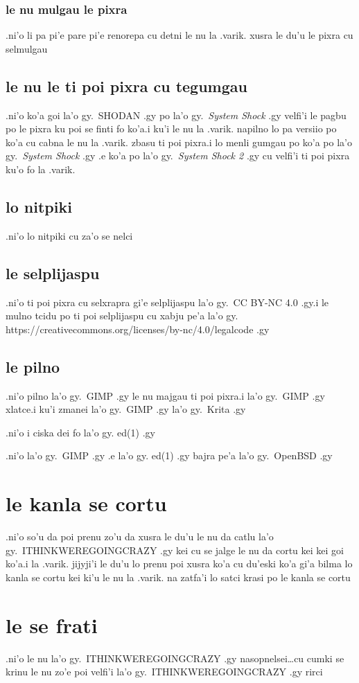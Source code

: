 \documentclass{report}
\begin{document}
\subsubsection{le nu mulgau le pixra}
.ni'o li pa pi'e pare pi'e renorepa cu detni le nu la .varik. xusra le du'u le pixra cu selmulgau
\subsection{le nu le ti poi pixra cu tegumgau}
.ni'o ko'a goi la'o gy.\ SHODAN .gy po la'o gy.\ \textit{System Shock} .gy velfi'i le pagbu po le pixra ku poi se finti fo ko'a\@  .i ku'i le nu la .varik. napilno lo pa versiio po ko'a cu cabna le nu la .varik. zbasu ti poi pixra\@  .i lo menli gumgau po ko'a po la'o gy.\ \textit{System Shock} .gy .e ko'a po la'o gy.\ \textit{System Shock 2} .gy cu velfi'i ti poi pixra ku'o fo la .varik.
\subsection{lo nitpiki}
.ni'o lo nitpiki cu za'o se nelci
\subsection{le selplijaspu}
.ni'o ti poi pixra cu selxrapra gi'e selplijaspu la'o gy.\ CC BY-NC 4.0 .gy\@ .i le mulno tcidu po ti poi selplijaspu cu xabju pe'a la'o gy. https://creativecommons.org/licenses/by-nc/4.0/legalcode .gy
\subsection{le pilno}
.ni'o pilno la'o gy.\ GIMP .gy le nu majgau ti poi pixra\@ .i  la'o gy.\ GIMP .gy xlatce\@ .i ku'i zmanei la'o gy.\ GIMP .gy la'o gy.\ Krita .gy

.ni'o i ciska dei fo la'o gy. ed(1) .gy

.ni'o la'o gy.\ GIMP .gy .e la'o gy. ed(1) .gy bajra pe'a la'o gy.\ OpenBSD .gy
\section{le kanla se cortu}
.ni'o so'u da poi prenu zo'u da xusra le du'u le nu da catlu la'o gy.\ ITHINKWEREGOINGCRAZY .gy kei cu se jalge le nu da cortu kei kei goi ko'a\@  .i la .varik. jijyji'i le du'u lo prenu poi xusra ko'a cu du'eski ko'a gi'a bilma lo kanla se cortu kei ki'u le nu la .varik. na zatfa'i lo satci krasi po le kanla se cortu
\section{le se frati}
.ni'o le nu la'o gy.\ ITHINKWEREGOINGCRAZY .gy nasopnelsei\ldots cu cumki se krinu le nu zo'e poi velfi'i la'o gy.\ ITHINKWEREGOINGCRAZY .gy rirci
\end{document}
